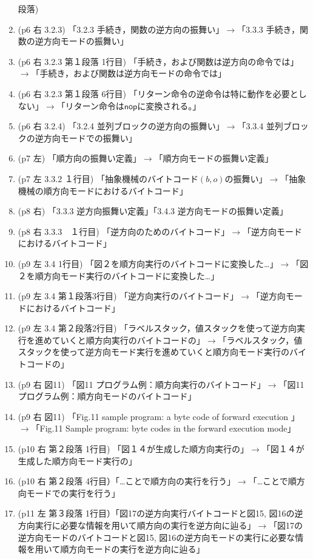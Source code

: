 \documentclass[a4j]{jarticle}
\begin{document}
\begin{enumerate}
段落)   
\item (p6 右 3.2.3) 「3.2.3 手続き，関数の逆方向の振舞い」$\rightarrow$「3.3.3 手続き，関数の逆方向モードの振舞い」
\item (p6 右 3.2.3 第１段落 1行目) 「手続き，および関数は逆方向の命令では」$\rightarrow$「手続き，および関数は逆方向モードの命令では」
\item (p6 右 3.2.3 第１段落 6行目) 「リターン命令の逆命令は特に動作を必要としない」$\rightarrow$「リターン命令は$\mathsf{nop}$に変換される。」
\item (p6 右 3.2.4) 「3.2.4 並列ブロックの逆方向の振舞い」$\rightarrow$「3.3.4 並列ブロックの逆方向モードでの振舞い」
\item (p7 左) 「順方向の振舞い定義」$\rightarrow$「順方向モードの振舞い定義」
\item (p7 左 3.3.2 １行目)  「抽象機械のバイトコード$(b,o)$の振舞い」$\rightarrow$「抽象機械の順方向モードにおけるバイトコード」
\item (p8 右) 「3.3.3 逆方向振舞い定義」「3.4.3 逆方向モードの振舞い定義」
\item (p8 右 3.3.3　１行目) 「逆方向のためのバイトコード」$\rightarrow$「逆方向モードにおけるバイトコード」
\item (p9 左 3.4 1行目) 「図２を順方向実行のバイトコードに変換した…」$\rightarrow$「図２を順方向モード実行のバイトコードに変換した…」
\item (p9 左 3.4 第１段落3行目) 「逆方向実行のバイトコード」$\rightarrow$「逆方向モードにおけるバイトコード」
\item (p9 左 3.4 第２段落2行目) 「ラベルスタック，値スタックを使って逆方向実行を進めていくと順方向実行のバイトコードの」$\rightarrow$「ラベルスタック，値スタックを使って逆方向モード実行を進めていくと順方向モード実行のバイトコードの」
\item (p9 右 図11) 「図11 プログラム例：順方向実行のバイトコード」$\rightarrow$「図11 プログラム例：順方向モードのバイトコード」
\item (p9 右 図11)  「Fig.11 sample program: a byte code of forward execution 」$\rightarrow$「Fig.11 Sample program: byte codes in the forward execution mode」
\item (p10 右 第２段落 1行目) 「図１４が生成した順方向実行の」$\rightarrow$「図１４が生成した順方向モード実行の」
\item (p10 右 第２段落 4行目）「…ことで順方向の実行を行う」$\rightarrow$「…ことで順方向モードでの実行を行う」
\item (p11 左 第３段落 1行目）「図17の逆方向実行バイトコードと図15, 図16の逆方向実行に必要な情報を用いて順方向の実行を逆方向に辿る」$\rightarrow$「図17の逆方向モードのバイトコードと図15, 図16の逆方向モードの実行に必要な情報を用いて順方向モードの実行を逆方向に辿る」

\end{enumerate}
\end{document}
